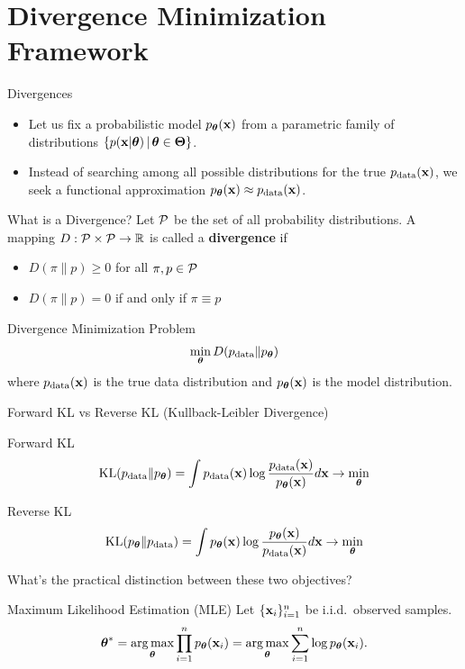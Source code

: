 \documentclass{beamer}
\begin{document}
\section{Divergence Minimization Framework}
\begin{frame}{Divergences}
	\begin{itemize}
	\item Let us fix a probabilistic model $p_{\boldsymbol{\theta}}(\mathbf{x})$ from a parametric family of distributions $\{p(\mathbf{x} | \boldsymbol{\theta}) \, | \, \boldsymbol{\theta} \in \boldsymbol{\Theta}\}$.\\
        \eqpause
	\item Instead of searching among all possible distributions for the true $p_{\text{data}}(\mathbf{x})$, we seek a functional approximation $p_{\boldsymbol{\theta}}(\mathbf{x}) \approx p_{\text{data}}(\mathbf{x})$.
	\end{itemize}
    \eqpause
	\begin{block}{What is a Divergence?}
		Let $\mathcal{P}$ be the set of all probability distributions. A mapping $D: \mathcal{P} \times \mathcal{P} \to \mathbb{R}$ is called a \textbf{divergence} if 
		\begin{itemize}
			\item $D(\pi \| p) \geq 0$ for all $\pi, p \in \mathcal{P}$
			\item $D(\pi \| p) = 0$ if and only if $\pi \equiv p$
		\end{itemize}
	\end{block}
    \eqpause
	\begin{block}{Divergence Minimization Problem}
		\vspace{-0.3cm}
		$$
		\min_{\boldsymbol{\theta}} D(p_{\text{data}} \| p_{\boldsymbol{\theta}})
		$$
		where $p_{\text{data}}(\mathbf{x})$ is the true data distribution and $p_{\boldsymbol{\theta}}(\mathbf{x})$ is the model distribution.
	\end{block}
\end{frame}
\begin{frame}{Forward KL vs Reverse KL (Kullback-Leibler Divergence)}
	\begin{block}{Forward KL}
		\vspace{-0.2cm}
		\[
			\mathrm{KL}(p_{\text{data}} \| p_{\boldsymbol{\theta}}) = \int p_{\text{data}}(\mathbf{x}) \log \frac{p_{\text{data}}(\mathbf{x})}{p_{\boldsymbol{\theta}}(\mathbf{x})} d \mathbf{x} \rightarrow \min_{\boldsymbol{\theta}}
		\]
	\end{block}
    \eqpause
	\begin{block}{Reverse KL}
		\vspace{-0.2cm}
		\[
			\mathrm{KL}(p_{\boldsymbol{\theta}} \| p_{\text{data}}) = \int p_{\boldsymbol{\theta}}(\mathbf{x}) \log \frac{p_{\boldsymbol{\theta}}(\mathbf{x})}{p_{\text{data}}(\mathbf{x})} d \mathbf{x} \rightarrow \min_{\boldsymbol{\theta}}
		\]
	\end{block}
    \eqpause
	What's the practical distinction between these two objectives?
    \eqpause
	\begin{block}{Maximum Likelihood Estimation (MLE)}
	Let $\{\mathbf{x}_i\}_{i=1}^n$ be i.i.d.\ observed samples.
		\vspace{-0.3cm}
		\[
			\boldsymbol{\theta}^* = \operatorname*{arg\,max}_{\boldsymbol{\theta}} \prod_{i=1}^n p_{\boldsymbol{\theta}}(\mathbf{x}_i) = \operatorname*{arg\,max}_{\boldsymbol{\theta}} \sum_{i=1}^n \log p_{\boldsymbol{\theta}}(\mathbf{x}_i).
		\]
	\end{block}
\end{frame}
\end{document}

